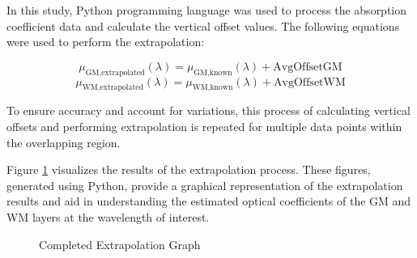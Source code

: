 \documentclass[journal,twoside,web]{ieeecolor}
\begin{document}
In this study, Python programming language was used to process the absorption coefficient data and calculate the vertical offset values. 
The following equations were used to perform the extrapolation:

\[
\mu_{\text{GM,extrapolated}}(\lambda) = \mu_{\text{GM,known}}(\lambda) + \text{AvgOffsetGM}
\]
\[
\mu_{\text{WM,extrapolated}}(\lambda) = \mu_{\text{WM,known}}(\lambda) + \text{AvgOffsetWM}
\]

To ensure accuracy and account for variations, this process of calculating vertical offsets and performing extrapolation is repeated for 
multiple data points within the overlapping region.

Figure \ref{fig:Extrapolation} visualizes the results of the extrapolation process.  These figures, generated using Python, provide a graphical representation of the extrapolation results and aid in understanding the estimated optical coefficients of the GM and WM layers at the wavelength of interest.
\begin{figure}[!htb]
    \caption{\label{fig:Extrapolation} Completed Extrapolation Graph}
\end{figure}


\end{document}
